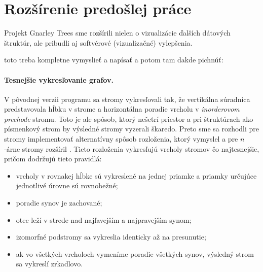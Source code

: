 \section{Rozšírenie predošlej práce}

Projekt Gnarley Trees sme rozšírili nielen o vizualizácie ďalších dátových
štruktúr, ale pribudli aj softvérové (vizualizačné) vylepšenia.

toto treba kompletne vymyslieť a napísať a potom tam dakde pichnúť:

\paragraph{Tesnejšie vykresľovanie grafov.}
V pôvodnej verzii programu sa stromy vykresľovali tak, že vertikálna súradnica 
predstavovala hĺbku v strome a horizontálna poradie vrcholu v \emph{
inorderovom prechode} stromu. Toto je ale spôsob, ktorý 
nešetrí priestor a pri štruktúrach ako písmenkový strom by výsledné stromy 
vyzerali škaredo. Preto sme sa rozhodli pre stromy implementovať 
alternatívny spôsob rozloženia, ktorý vymyslel \citet{reingold} a pre $n$-árne 
stromy rozšíril \citet{walker}. Tieto rozloženia vykresľujú vrcholy stromov čo 
najtesnejšie, pričom dodržujú tieto pravidlá: 
\begin{itemize} 
\item vrcholy v rovnakej hĺbke sú vykreslené na jednej priamke a priamky 
určujúce jednotlivé úrovne sú rovnobežné; 
\item poradie synov je zachované; 
\item otec leží v strede nad najľavejším a najpravejším synom; 
\item izomorfné podstromy sa vykreslia identicky až na presunutie;
\item ak vo všetkých vrcholoch vymeníme poradie všetkých synov, výsledný strom 
sa vykreslí zrkadlovo.
\end{itemize}
